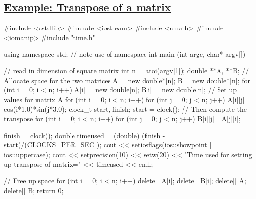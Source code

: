 \documentclass[%
oneside,                 %
final,                   %
10pt]{article}
\begin{document}
\subsection{\href{{https://github.com/CompPhysics/ComputationalPhysicsMSU/blob/master/doc/Programs/LecturePrograms/programs/Classes/cpp/program8.cpp}}{Example: Transpose of a matrix}}


















































\bcppcode
#include <cstdlib>
#include <iostream>
#include <cmath>
#include <iomanip>
#include "time.h"

using namespace std; // note use of namespace
int main (int argc, char* argv[])
{
  // read in dimension of square matrix
  int n = atoi(argv[1]);
  double **A, **B;
  // Allocate space for the two matrices
  A = new double*[n]; B = new double*[n];
  for (int i = 0; i < n; i++){
    A[i] = new double[n];
    B[i] = new double[n];
  }
  // Set up values for matrix A
  for (int i = 0; i < n; i++){
    for (int j = 0; j < n; j++) {
      A[i][j] =  cos(i*1.0)*sin(j*3.0);
    }
  }
  clock_t start, finish;
  start = clock();
  // Then compute the transpose
  for (int i = 0; i < n; i++){
    for (int j = 0; j < n; j++) {
      B[i][j]= A[j][i];
    }
  }

  finish = clock();
  double timeused = (double) (finish - start)/(CLOCKS_PER_SEC );
  cout << setiosflags(ios::showpoint | ios::uppercase);
  cout << setprecision(10) << setw(20) << "Time used  for setting up transpose of matrix=" << timeused  << endl;

  // Free up space
  for (int i = 0; i < n; i++){
    delete[] A[i];
    delete[] B[i];
  }
  delete[] A;
  delete[] B;
  return 0;
}
\end{document}
